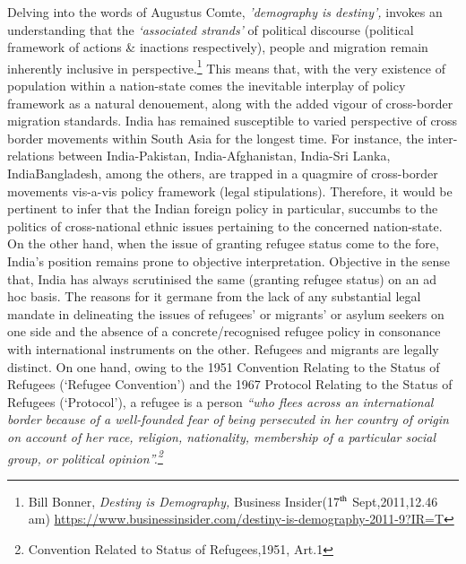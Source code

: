 \setcounter{figure}{0}
\setcounter{table}{0}


\begin{multicols}{2}


\noi
Delving into the words of Augustus Comte, \textit{'demography is destiny',} invokes an
understanding that the \textit{‘associated strands’} of political discourse (political framework of
actions \& inactions respectively), people and migration remain inherently inclusive in
perspective.\footnote{Bill Bonner, \textit{Destiny is Demography,} Business Insider(17$^{\rm th}$ Sept,2011,12.46 am)
\url{https://www.businessinsider.com/destiny-is-demography-2011-9?IR=T}}  This means that, with the very existence of population within a nation-state
comes the inevitable interplay of policy framework as a natural denouement, along with the
added vigour of cross-border migration standards. India has remained susceptible to varied
perspective of cross border movements within South Asia for the longest time. For instance,
the inter-relations between India-Pakistan, India-Afghanistan, India-Sri Lanka, IndiaBangladesh, among the others, are trapped in a quagmire of cross-border movements vis-a-vis
policy framework (legal stipulations). Therefore, it would be pertinent to infer that the Indian
foreign policy in particular, succumbs to the politics of cross-national ethnic issues pertaining
to the concerned nation-state. On the other hand, when the issue of granting refugee status
come to the fore, India’s position remains prone to objective interpretation. Objective in the
sense that, India has always scrutinised the same (granting refugee status) on an ad hoc basis.
The reasons for it germane from the lack of any substantial legal mandate in delineating the
issues of refugees’ or migrants’ or asylum seekers on one side and the absence of a
concrete/recognised refugee policy in consonance with international instruments on the other.
Refugees and migrants are legally distinct. On one hand, owing to the 1951 Convention
Relating to the Status of Refugees (‘Refugee Convention’) and the 1967 Protocol Relating to
the Status of Refugees (‘Protocol’), a refugee is a person \textit{“who flees across an international
border because of a well-founded fear of being persecuted in her country of origin on account
of her race, religion, nationality, membership of a particular social group, or political
opinion”.\footnote{Convention Related to Status of Refugees,1951, Art.1}}


\end{multicols}

